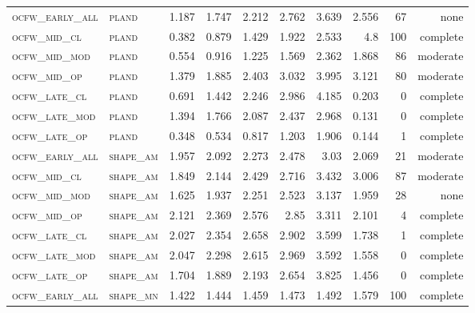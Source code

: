 \begin{landscape}
\begin{center}
\begin{footnotesize}
\begin{longtable}{llrrrrr|rrr}
\textsc{ocfw\_early\_all} & \textsc{pland     }    & 1.187    & 1.747    & 2.212    & 2.762    & 3.639    & 2.556    & 67  & none     \\
\textsc{ocfw\_mid\_cl   } & \textsc{pland     }    & 0.382    & 0.879    & 1.429    & 1.922    & 2.533    & 4.8      & 100 & complete \\
\textsc{ocfw\_mid\_mod  } & \textsc{pland     }    & 0.554    & 0.916    & 1.225    & 1.569    & 2.362    & 1.868    & 86  & moderate \\
\textsc{ocfw\_mid\_op   } & \textsc{pland     }    & 1.379    & 1.885    & 2.403    & 3.032    & 3.995    & 3.121    & 80  & moderate \\
\textsc{ocfw\_late\_cl  } & \textsc{pland     }    & 0.691    & 1.442    & 2.246    & 2.986    & 4.185    & 0.203    & 0   & complete \\
\textsc{ocfw\_late\_mod } & \textsc{pland     }    & 1.394    & 1.766    & 2.087    & 2.437    & 2.968    & 0.131    & 0   & complete \\
\textsc{ocfw\_late\_op  } & \textsc{pland     }    & 0.348    & 0.534    & 0.817    & 1.203    & 1.906    & 0.144    & 1   & complete \\
\textsc{ocfw\_early\_all} & \textsc{shape\_am }    & 1.957    & 2.092    & 2.273    & 2.478    & 3.03     & 2.069    & 21  & moderate \\
\textsc{ocfw\_mid\_cl   } & \textsc{shape\_am }    & 1.849    & 2.144    & 2.429    & 2.716    & 3.432    & 3.006    & 87  & moderate \\
\textsc{ocfw\_mid\_mod  } & \textsc{shape\_am }    & 1.625    & 1.937    & 2.251    & 2.523    & 3.137    & 1.959    & 28  & none     \\
\textsc{ocfw\_mid\_op   } & \textsc{shape\_am }    & 2.121    & 2.369    & 2.576    & 2.85     & 3.311    & 2.101    & 4   & complete \\
\textsc{ocfw\_late\_cl  } & \textsc{shape\_am }    & 2.027    & 2.354    & 2.658    & 2.902    & 3.599    & 1.738    & 1   & complete \\
\textsc{ocfw\_late\_mod } & \textsc{shape\_am }    & 2.047    & 2.298    & 2.615    & 2.969    & 3.592    & 1.558    & 0   & complete \\
\textsc{ocfw\_late\_op  } & \textsc{shape\_am }    & 1.704    & 1.889    & 2.193    & 2.654    & 3.825    & 1.456    & 0   & complete \\
\textsc{ocfw\_early\_all} & \textsc{shape\_mn }    & 1.422    & 1.444    & 1.459    & 1.473    & 1.492    & 1.579    & 100 & complete \\

\end{longtable}
\end{footnotesize}
\end{center}
\end{landscape}

